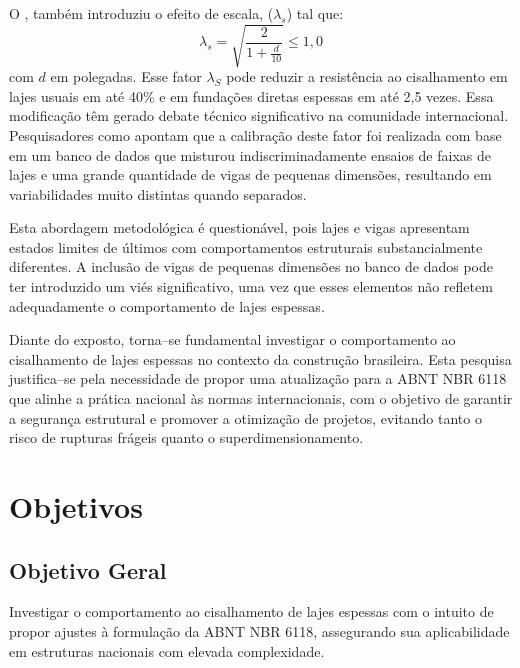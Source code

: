 O \textcite{ACI318:2019}, também introduziu o efeito de escala, ($\lambda_s$) tal que:
\begin{equation}
\lambda_s = \sqrt{\frac{2}{1+\frac{d}{10}}}\leq 1,0    
\end{equation}
com $d$ em polegadas. Esse fator $\lambda_S$ pode reduzir a resistência ao cisalhamento em lajes usuais em até 40\% e em fundações diretas espessas em até 2,5 vezes. Essa modificação têm gerado debate técnico significativo na comunidade internacional. Pesquisadores como \textcite{Marquesi2021} apontam que a calibração deste fator foi realizada com base em um banco de dados que misturou indiscriminadamente ensaios de faixas de lajes e uma grande quantidade de vigas de pequenas dimensões, resultando em variabilidades muito distintas quando separados. 

Esta abordagem metodológica é questionável, pois lajes e vigas apresentam estados limites de últimos com comportamentos estruturais substancialmente diferentes. A inclusão de vigas de pequenas dimensões no banco de dados pode ter introduzido um viés significativo, uma vez que esses elementos não refletem adequadamente o comportamento de lajes espessas. 

Diante do exposto, torna--se fundamental investigar o comportamento ao cisalhamento de lajes espessas no contexto da construção brasileira. Esta pesquisa justifica--se pela necessidade de propor uma atualização para a ABNT NBR 6118 que alinhe a prática nacional às normas internacionais, com o objetivo de garantir a segurança estrutural e promover a otimização de projetos, evitando tanto o risco de rupturas frágeis quanto o superdimensionamento.



\chapter{Objetivos}
\section{Objetivo Geral}

Investigar o comportamento ao cisalhamento de lajes espessas com o intuito de propor ajustes à formulação da ABNT NBR 6118, assegurando sua aplicabilidade em estruturas nacionais com elevada complexidade.

